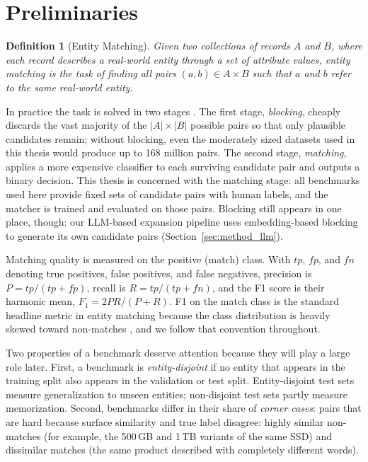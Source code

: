 \documentclass[a4paper,oneside,bibliography=totoc]{scrbook}
\newtheorem{definition}{Definition}
\begin{document}
\section{Preliminaries}
\label{sec:preliminaries}

\begin{definition}[Entity Matching]
Given two collections of records $A$ and $B$, where each record describes a real-world entity through a set of attribute values, entity matching is the task of finding all pairs $(a, b) \in A \times B$ such that $a$ and $b$ refer to the same real-world entity.
\end{definition}

In practice the task is solved in two stages \cite{christen2012data,papadakis2020blocking}. The first stage, \emph{blocking}, cheaply discards the vast majority of the $|A| \times |B|$ possible pairs so that only plausible candidates remain; without blocking, even the moderately sized datasets used in this thesis would produce up to 168 million pairs. The second stage, \emph{matching}, applies a more expensive classifier to each surviving candidate pair and outputs a binary decision. This thesis is concerned with the matching stage: all benchmarks used here provide fixed sets of candidate pairs with human labels, and the matcher is trained and evaluated on those pairs. Blocking still appears in one place, though: our LLM-based expansion pipeline uses embedding-based blocking to generate its own candidate pairs (Section~\ref{sec:method_llm}).

Matching quality is measured on the positive (match) class. With $tp$, $fp$, and $fn$ denoting true positives, false positives, and false negatives, precision is $P = tp/(tp+fp)$, recall is $R = tp/(tp+fn)$, and the F1 score is their harmonic mean, $F_1 = 2PR/(P+R)$. F1 on the match class is the standard headline metric in entity matching because the class distribution is heavily skewed toward non-matches \cite{kopcke2010evaluation}, and we follow that convention throughout.

Two properties of a benchmark deserve attention because they will play a large role later. First, a benchmark is \emph{entity-disjoint} if no entity that appears in the training split also appears in the validation or test split. Entity-disjoint test sets measure generalization to unseen entities; non-disjoint test sets partly measure memorization. Second, benchmarks differ in their share of \emph{corner cases}: pairs that are hard because surface similarity and true label disagree: highly similar non-matches (for example, the 500\,GB and 1\,TB variants of the same SSD) and dissimilar matches (the same product described with completely different words).
\end{document}
